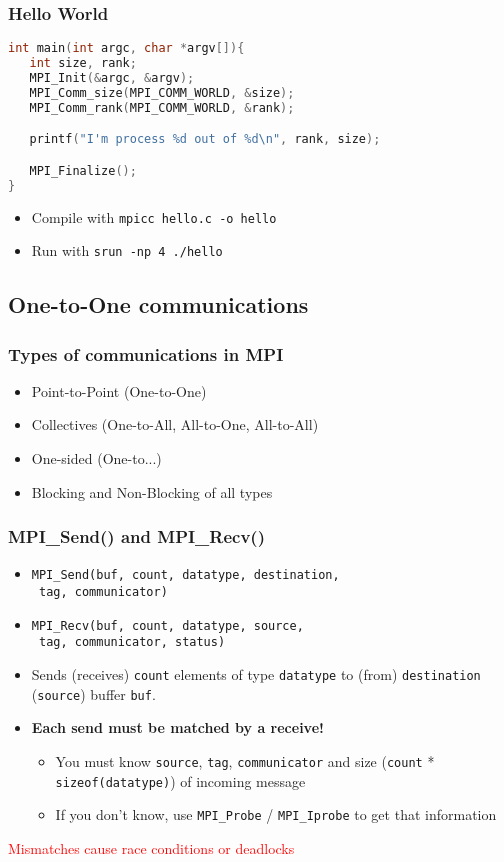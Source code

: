 \begin{frame}[containsverbatim]
\frametitle{Hello World}

\begin{lstlisting}[language=C,frame=lines]
int main(int argc, char *argv[]){
   int size, rank;
   MPI_Init(&argc, &argv);
   MPI_Comm_size(MPI_COMM_WORLD, &size);
   MPI_Comm_rank(MPI_COMM_WORLD, &rank);

   printf("I'm process %d out of %d\n", rank, size);

   MPI_Finalize();
}
\end{lstlisting}
\begin{itemize}
	\item{Compile with \verb+mpicc hello.c -o hello+}
	\item{Run with \verb+srun -np 4 ./hello+}
\end{itemize}
\end{frame}


\subsection{One-to-One communications}

\begin{frame}[containsverbatim]
\frametitle{Types of communications in MPI}
	\begin{itemize}
	\item {Point-to-Point (One-to-One)}
	\item {Collectives (One-to-All, All-to-One, All-to-All)}
	\item {One-sided (One-to...)}
	\item {Blocking and Non-Blocking of all types}
	\end{itemize}
\end{frame}


\begin{frame}[containsverbatim]
\frametitle{MPI\_Send() and MPI\_Recv()}
	\begin{itemize}
	\item {\verb+MPI_Send(buf, count, datatype, destination, +\\ \verb+ tag, communicator)+}
	\item {\verb+MPI_Recv(buf, count, datatype, source, + \\ \verb+ tag, communicator, status)+}
	\item {Sends (receives) \verb+count+ elements of type \verb+datatype+ to (from) \verb+destination+ (\verb+source+) buffer \verb+buf+.}
	\item {{\bf Each send must be matched by a receive!}
		\begin{itemize}
			\item{You must know \verb+source+, \verb+tag+, \verb+communicator+ and size (\verb+count+ * \verb+sizeof(datatype)+) of incoming message}
			\item{If you don’t know, use \verb+MPI_Probe+ / \verb+MPI_Iprobe+ to get that information}
		\end{itemize}
	}
	\end{itemize}
	\textcolor{red}{Mismatches cause race conditions or deadlocks}
\end{frame}


